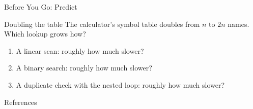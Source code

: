 \documentclass[aspectratio=169]{beamer}
\begin{document}
\begin{frame}{Before You Go: Predict}
  \begin{block}{Doubling the table}
    The calculator's symbol table doubles from $n$ to $2n$ names. Which lookup
    grows how?
  \end{block}
  \begin{enumerate}
    \item A linear scan: roughly how much slower?
    \item A binary search: roughly how much slower?
    \item A duplicate check with the nested loop: roughly how much slower?
  \end{enumerate}
\end{frame}

\begin{frame}[allowframebreaks]{References}
  \footnotesize
  
  
\end{frame}
\end{document}
